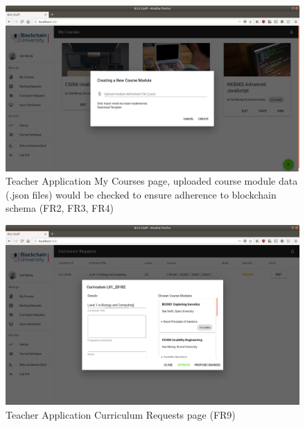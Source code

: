 \begin{figure}[!ht]
	\centering
	\includegraphics[width=1.05\textwidth]{Teacher_createcourse}
	\caption[Teacher Application My Courses page]
	{Teacher Application My Courses page, uploaded course module data (.json files) would be 
	checked to ensure adherence to blockchain schema (FR2, FR3, FR4)}
	\label{fig:Teacher_createcourse}
\end{figure}

\begin{figure}[!ht]
	\centering
	\includegraphics[width=1.05\textwidth]{Teacher_approvecurr}
	\caption[Teacher Application Curriculum Requests page]
	{Teacher Application Curriculum Requests page (FR9)}
	\label{fig:Teacher_approvecurr}
\end{figure}

